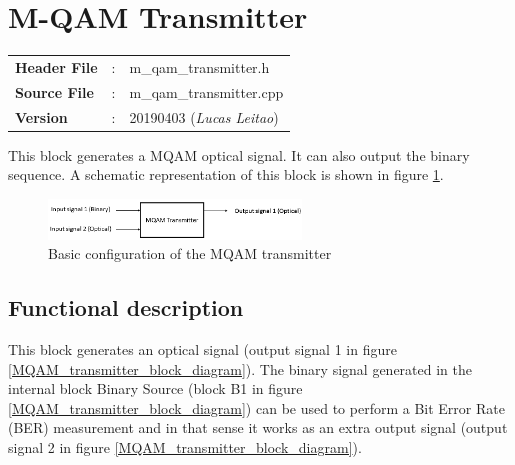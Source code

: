 \clearpage
\section{M-QAM Transmitter}

\begin{tcolorbox}	
	\begin{tabular}{p{2.75cm} p{0.2cm} p{10.5cm}} 	
		\textbf{Header File}   &:& m\_qam\_transmitter.h \\
		\textbf{Source File}   &:& m\_qam\_transmitter.cpp \\
        \textbf{Version}       &:& 20190403 (\emph{Lucas Leitao})\\
	\end{tabular}
\end{tcolorbox}

This block generates a MQAM optical signal. It can also output the binary sequence. A schematic representation of this block is shown in figure \ref{MQAM_transmitter_block_diagram_simple}.

\begin{figure}[h]
	\centering
	\includegraphics[width=0.6\textwidth]{./lib/m_qam_transmitter/figures/MQAM_transmitter_block_diagram_simple}
	\caption{Basic configuration of the MQAM transmitter}\label{MQAM_transmitter_block_diagram_simple}
\end{figure}

\subsection*{Functional description}

This block generates an optical signal (output signal 1 in figure \ref{MQAM_transmitter_block_diagram}). The binary signal generated in the internal block Binary Source (block B1 in figure \ref{MQAM_transmitter_block_diagram}) can be used to perform a Bit Error Rate (BER) measurement and in that sense it works as an extra output signal (output signal 2 in figure \ref{MQAM_transmitter_block_diagram}).

